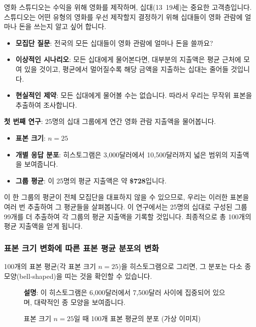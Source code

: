 \documentclass[11pt,a4paper]{article}
\theoremstyle{definition}
\begin{document}
\begin{examplebox}[예시: 십대들의 영화 관람 지출]
영화 스튜디오는 수익을 위해 영화를 제작하며, 십대(13~19세)는 중요한 고객층입니다. 스튜디오는 어떤 유형의 영화를 우선 제작할지 결정하기 위해 십대들이 영화 관람에 얼마나 돈을 쓰는지 알고 싶어 합니다.

\begin{itemize}
    \item \textbf{모집단 질문}: 전국의 모든 십대들이 영화 관람에 얼마나 돈을 쓸까요?
    \item \textbf{이상적인 시나리오}: 모든 십대에게 물어본다면, 대부분의 지출액은 평균 근처에 모여 있을 것이고, 평균에서 멀어질수록 해당 금액을 지출하는 십대는 줄어들 것입니다.
    \item \textbf{현실적인 제약}: 모든 십대에게 물어볼 수는 없습니다. 따라서 우리는 무작위 표본을 추출하여 조사합니다.
\end{itemize}

\textbf{첫 번째 연구}: 25명의 십대 그룹에게 연간 영화 관람 지출액을 물어봅니다.
\begin{itemize}
    \item \textbf{표본 크기}: $n = 25$
    \item \textbf{개별 응답 분포}: 히스토그램은 3,000달러에서 10,500달러까지 넓은 범위의 지출액을 보여줍니다.
    \item \textbf{그룹 평균}: 이 25명의 평균 지출액은 약 \textbf{\$728}입니다.
\end{itemize}
이 한 그룹의 평균이 전체 모집단을 대표하지 않을 수 있으므로, 우리는 이러한 표본을 여러 번 추출하여 그 평균들을 살펴봅니다. 이 연구에서는 25명의 십대로 구성된 그룹 99개를 더 추출하여 각 그룹의 평균 지출액을 기록할 것입니다. 최종적으로 총 100개의 평균 지출액을 얻게 됩니다.
\end{examplebox}

\subsubsection*{표본 크기 변화에 따른 표본 평균 분포의 변화}

100개의 표본 평균(각 표본 크기 $n=25$)을 히스토그램으로 그리면, 그 분포는 다소 종 모양(bell-shaped)을 띠는 것을 확인할 수 있습니다.

\begin{figure}[h!]
    \centering
    \caption{표본 크기 $n=25$일 때 100개 표본 평균의 분포 (가상 이미지)}
    \label{fig:hist_n25}
    \textbf{설명}: 이 히스토그램은 6,000달러에서 7,500달러 사이에 집중되어 있으며, 대략적인 종 모양을 보여줍니다.
\end{figure}
\end{document}
